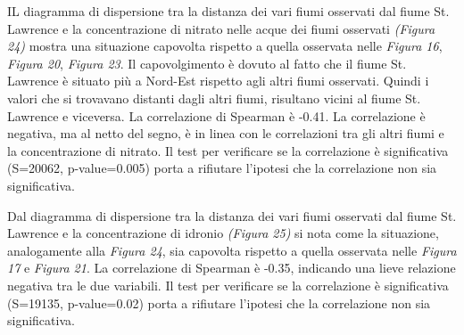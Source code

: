 \documentclass{article} %
\begin{document}
IL diagramma di dispersione tra la distanza dei vari fiumi osservati dal fiume St. Lawrence e la concentrazione di nitrato nelle acque dei fiumi osservati \textit{(Figura 24)} mostra una situazione capovolta rispetto a quella osservata nelle \textit{Figura 16}, \textit{Figura 20}, \textit{Figura 23}.
Il capovolgimento è dovuto al fatto che il fiume St. Lawrence è situato più a Nord-Est rispetto agli altri fiumi osservati. Quindi i valori che si trovavano distanti dagli altri fiumi, risultano vicini al fiume St. Lawrence e viceversa. 
La correlazione di Spearman è -0.41. La correlazione è negativa, ma al netto del segno, è in linea con le correlazioni tra gli altri fiumi e la concentrazione di nitrato.  
Il test per verificare se la correlazione è significativa (S=20062, p-value=0.005) porta a rifiutare l'ipotesi che la correlazione non sia significativa.

Dal diagramma di dispersione tra la distanza dei vari fiumi osservati dal fiume St. Lawrence e la concentrazione di idronio \textit{(Figura 25)} si nota come la situazione, analogamente alla \textit{Figura 24}, sia capovolta rispetto a quella osservata nelle \textit{Figura 17} e \textit{Figura 21}.
La correlazione di Spearman è -0.35, indicando una lieve relazione negativa tra le due variabili. 
Il test per verificare se la correlazione è significativa (S=19135, p-value=0.02) porta a rifiutare l'ipotesi che la correlazione non sia significativa.
\end{document}
